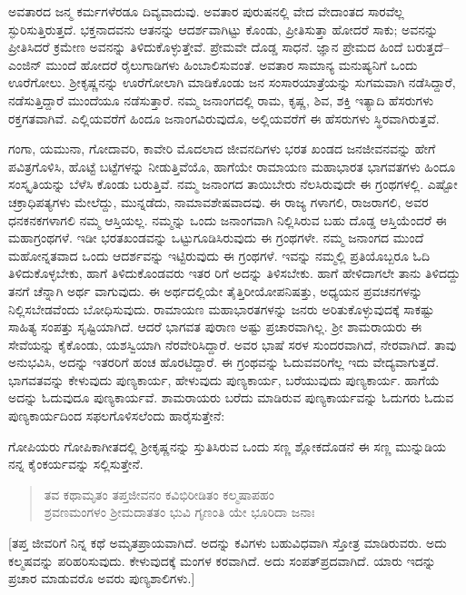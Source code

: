 ಅವತಾರದ ಜನ್ಮ ಕರ್ಮಗಳೆರಡೂ ದಿವ್ಯವಾದುವು. ಅವತಾರ ಪುರುಷನಲ್ಲಿ ವೇದ ವೇದಾಂತದ ಸಾರವೆಲ್ಲ ಸ್ಫುರಿಸುತ್ತಿರುತ್ತದೆ. ಭಕ್ತನಾದವನು ಆತನನ್ನು ಆದರ್ಶವಾಗಿಟ್ಟು ಕೊಂಡು, ಪ್ರೀತಿಸುತ್ತಾ ಹೋದರೆ ಸಾಕು; ಅವನನ್ನು ಪ್ರೀತಿಸಿದರೆ ಕ್ರಮೇಣ ಅವನನ್ನು ತಿಳಿದುಕೊಳ್ಳುತ್ತೇವೆ. ಪ್ರೇಮವೇ ದೊಡ್ಡ ಸಾಧನೆ. ಜ್ಞಾನ ಪ್ರೇಮದ ಹಿಂದೆ ಬರುತ್ತದೆ– ಎಂಜಿನ್ ಮುಂದೆ ಹೋದರೆ ರೈಲುಗಾಡಿಗಳು ಹಿಂಬಾಲಿಸುವಂತೆ. ಅವತಾರ ಸಾಮಾನ್ಯ ಮನುಷ್ಯನಿಗೆ ಒಂದು ಊರೆಗೋಲು. ಶ್ರೀಕೃಷ್ಣನನ್ನು ಊರೆಗೋಲಾಗಿ ಮಾಡಿಕೊಂಡು ಜನ ಸಂಸಾರಯಾತ್ರೆಯನ್ನು ಸುಗಮವಾಗಿ ನಡೆಸಿದ್ದಾರೆ, ನಡೆಸುತ್ತಿದ್ದಾರೆ ಮುಂದೆಯೂ ನಡೆಸುತ್ತಾರೆ. ನಮ್ಮ ಜನಾಂಗದಲ್ಲಿ ರಾಮ, ಕೃಷ್ಣ, ಶಿವ, ಶಕ್ತಿ ಇತ್ಯಾದಿ ಹೆಸರುಗಳು ರಕ್ತಗತವಾಗಿವೆ. ಎಲ್ಲಿಯವರೆಗೆ ಹಿಂದೂ ಜನಾಂಗವಿರುವುದೊ, ಅಲ್ಲಿಯವರೆಗೆ ಈ ಹೆಸರುಗಳು ಸ್ಥಿರವಾಗಿರುತ್ತವೆ.

ಗಂಗಾ, ಯಮುನಾ, ಗೋದಾವರಿ, ಕಾವೇರಿ ಮೊದಲಾದ ಜೀವನದಿಗಳು ಭರತ ಖಂಡದ ಜನಜೀವನವನ್ನು ಹೇಗೆ ಪವಿತ್ರಗೊಳಿಸಿ, ಹೊಟ್ಟೆ ಬಟ್ಟೆಗಳನ್ನು ನೀಡುತ್ತಿವೆಯೊ, ಹಾಗೆಯೇ ರಾಮಾಯಣ ಮಹಾಭಾರತ ಭಾಗವತಗಳು ಹಿಂದೂ ಸಂಸ್ಕೃತಿಯನ್ನು ಬೆಳೆಸಿ ಕೊಂಡು ಬರುತ್ತಿವೆ. ನಮ್ಮ ಜನಾಂಗದ ತಾಯಿಬೇರು ನೆಲಸಿರುವುದೇ ಈ ಗ್ರಂಥಗಳಲ್ಲಿ. ಎಷ್ಟೋ ಚಕ್ರಾಧಿಪತ್ಯಗಳು ಮೇಲೆದ್ದು, ಮುನ್ನಡೆದು, ನಾಮಾವಶೇಷವಾದವು. ಈ ರಾಜ್ಯ ಗಳಾಗಲಿ, ರಾಜರಾಗಲಿ, ಅವರ ಧನಕನಕಗಳಾಗಲಿ ನಮ್ಮ ಆಸ್ತಿಯಲ್ಲ. ನಮ್ಮನ್ನು ಒಂದು ಜನಾಂಗವಾಗಿ ನಿಲ್ಲಿಸಿರುವ ಬಹು ದೊಡ್ಡ ಆಸ್ತಿಯೆಂದರೆ ಈ ಮಹಾಗ್ರಂಥಗಳೆ. ಇಡೀ ಭರತಖಂಡವನ್ನು ಒಟ್ಟುಗೂಡಿಸಿರುವುದು ಈ ಗ್ರಂಥಗಳೇ. ನಮ್ಮ ಜನಾಂಗದ ಮುಂದೆ ಮಹೋನ್ನತವಾದ ಒಂದು ಆದರ್ಶವನ್ನು ಇಟ್ಟಿರುವುದು ಈ ಗ್ರಂಥಗಳೆ. ಇವನ್ನು ನಮ್ಮಲ್ಲಿ ಪ್ರತಿಯೊಬ್ಬರೂ ಓದಿ ತಿಳಿದುಕೊಳ್ಳಬೇಕು, ಹಾಗೆ ತಿಳಿದುಕೊಂಡವರು ಇತರ ರಿಗೆ ಅದನ್ನು ತಿಳಿಸಬೇಕು. ಹಾಗೆ ಹೇಳಿದಾಗಲೇ ತಾನು ತಿಳಿದದ್ದು ತನಗೆ ಚೆನ್ನಾಗಿ ಅರ್ಥ ವಾಗುವುದು. ಈ ಅರ್ಥದಲ್ಲಿಯೇ ತೈತ್ತಿರೀಯೋಪನಿಷತ್ತು, ಅಧ್ಯಯನ ಪ್ರವಚನಗಳನ್ನು ನಿಲ್ಲಿಸಬೇಡವೆಂದು ಬೋಧಿಸುವುದು. ರಾಮಾಯಣ ಮಹಾಭಾರತಗಳನ್ನು ಜನರು ಅರಿತುಕೊಳ್ಳುವುದಕ್ಕೆ ಸಾಕಷ್ಟು ಸಾಹಿತ್ಯ ಸಂಪತ್ತು ಸೃಷ್ಟಿಯಾಗಿದೆ. ಆದರೆ ಭಾಗವತ ಪುರಾಣ ಅಷ್ಟು ಪ್ರಚಾರವಾಗಿಲ್ಲ. ಶ್ರೀ ಶಾಮರಾಯರು ಈ ಸೇವೆಯನ್ನು ಕೈಕೊಂಡು, ಯಶಸ್ವಿಯಾಗಿ ನೆರವೇರಿಸಿದ್ದಾರೆ. ಅವರ ಭಾಷೆ ಸರಳ ಸುಂದರವಾಗಿದೆ, ನೇರವಾಗಿದೆ. ತಾವು ಅನುಭವಿಸಿ, ಅದನ್ನು ಇತರರಿಗೆ ಹಂಚ ಹೊರಟಿದ್ದಾರೆ. ಈ ಗ್ರಂಥವನ್ನು ಓದುವವರಿಗೆಲ್ಲ ಇದು ವೇದ್ಯವಾಗುತ್ತದೆ. ಭಾಗವತವನ್ನು ಕೇಳುವುದು ಪುಣ್ಯಕಾರ್ಯ, ಹೇಳುವುದು ಪುಣ್ಯಕಾರ್ಯ, ಬರೆಯುವುದು ಪುಣ್ಯಕಾರ್ಯ. ಹಾಗೆಯೆ ಅದನ್ನು ಓದುವುದೂ ಪುಣ್ಯಕಾರ್ಯವೆ. ಶಾಮರಾಯರು ಬರೆದು ಮಾಡಿರುವ ಪುಣ್ಯಕಾರ್ಯವನ್ನು ಓದುಗರು ಓದುವ ಪುಣ್ಯಕಾರ್ಯದಿಂದ ಸಫಲಗೊಳಿಸಲೆಂದು ಹಾರೈಸುತ್ತೇನೆ:

ಗೋಪಿಯರು ಗೋಪಿಕಾಗೀತದಲ್ಲಿ ಶ್ರೀಕೃಷ್ಣನನ್ನು ಸ್ತುತಿಸಿರುವ ಒಂದು ಸಣ್ಣ ಶ್ಲೋಕದೊಡನೆ ಈ ಸಣ್ಣ ಮುನ್ನುಡಿಯ ನನ್ನ ಕೈಂಕರ್ಯವನ್ನು ಸಲ್ಲಿಸುತ್ತೇನೆ.

\begin{verse}
ತವ ಕಥಾಮೃತಂ ತಪ್ತಜೀವನಂ ಕವಿಭಿರೀಡಿತಂ ಕಲ್ಮಷಾಪಹಂ\\ಶ್ರವಣಮಂಗಳಂ ಶ್ರೀಮದಾತತಂ ಭುವಿ ಗೃಣಂತಿ ಯೇ ಭೂರಿದಾ ಜನಾಃ
\end{verse}

[ತಪ್ತ ಜೀವರಿಗೆ ನಿನ್ನ ಕಥೆ ಅಮೃತಪ್ರಾಯವಾಗಿದೆ. ಅದನ್ನು ಕವಿಗಳು ಬಹುವಿಧವಾಗಿ ಸ್ತೋತ್ರ ಮಾಡಿರುವರು. ಅದು ಕಲ್ಮಷವನ್ನು ಪರಿಹರಿಸುವುದು. ಕೇಳುವುದಕ್ಕೆ ಮಂಗಳ ಕರವಾಗಿದೆ. ಅದು ಸಂಪತ್​ಪ್ರದವಾಗಿದೆ. ಯಾರು ಇದನ್ನು ಪ್ರಚಾರ ಮಾಡುವರೊ ಅವರು ಪುಣ್ಯಶಾಲಿಗಳು.]

